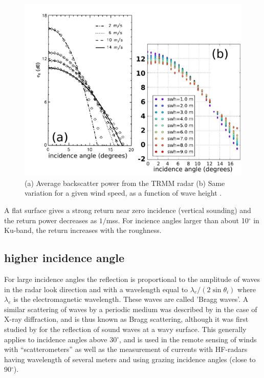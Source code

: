 \begin{figure}[htb]
\centerline{\includegraphics[width=0.6\linewidth]{FIGS_CH_REMOTE/sigma0.pdf}}
\caption[Radar return power in Ku-band as a function of wind speed, incidence angle and sea state]
{(a) Average backscatter power from the TRMM radar \citep[from][]{Freilich&Vanhoff2003} 
(b) Same variation for a given wind speed, as a function of wave height \citep[from][]{Nouguier&al.2016}. \label{fig:sigma0}}
\end{figure}




A flat surface gives a strong return near zero incidence (vertical sounding) and the return power decreases as $1/$mss. For incience angles 
larger than about 10$^\circ$ in Ku-band, the return increases with the roughness.


\subsection{higher incidence angle}
For large incidence angles the reflection is proportional to the amplitude of waves in the radar look direction and with a wavelength 
equal to $\lambda_e / (2 \sin \theta_i)$ where $\lambda_e$ is the electromagnetic wavelength. These waves are called 'Bragg waves'. A similar 
scattering of waves by a periodic medium was described by \cite{Bragg1913} in the case of X-ray diffraction, and is thus known as Bragg scattering, although it 
was first studied by \cite{Rayleigh1896} for the reflection of sound waves at a wavy surface. This generally applies to incidence angles above 30$^\circ$, and 
is used in the remote sensing of winds with ``scatterometers'' as well as the measurement of currents with HF-radars having wavelength of several meters and using 
grazing incidence angles (close to 90$^\circ$). 


